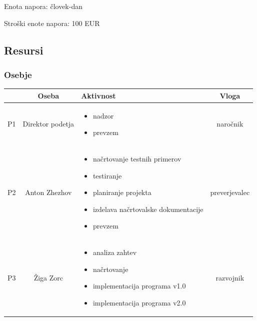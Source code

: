\documentclass[a4paper,12pt]{article}
\begin{document}
\begin{landscape}
\begin{center}
\begin{tabular}{|c|c|c|c|c|c|c|c|c|c|}
		\end{tabular}

				\vspace{1cm}

				Enota napora: človek-dan

				Stroški enote napora: 100 EUR
		\end{center}


\end{landscape}

\newpage

	\subsection{Resursi}

		\subsubsection{Osebje}
			\begin{center}
			\begin{tabular}{|c|c|>{\centering}m{}|c|}
				\hline
				&Oseba&Aktivnost&Vloga\\
				\hline
			  P1&Direktor podetja&
			\begin{itemize}
				\item nadzor
				\item prevzem
			\end{itemize}&naročnik\\
				\hline
			  P2&Anton Zhezhov&
				\begin{itemize}
					\item načrtovanje testnih primerov
					\item testiranje
					\item planiranje projekta
					\item izdelava načrtovalske dokumentacije
					\item prevzem
				\end{itemize}&preverjevalec\\
				\hline
			  P3&Žiga Zorc&
				\begin{itemize}
					\item analiza zahtev
					\item načrtovanje
					\item implementacija programa v1.0
					\item implementacija programa v2.0
				\end{itemize}&razvojnik\\
				\hline
			\end{tabular}
			\end{center}
		
\end{document}
